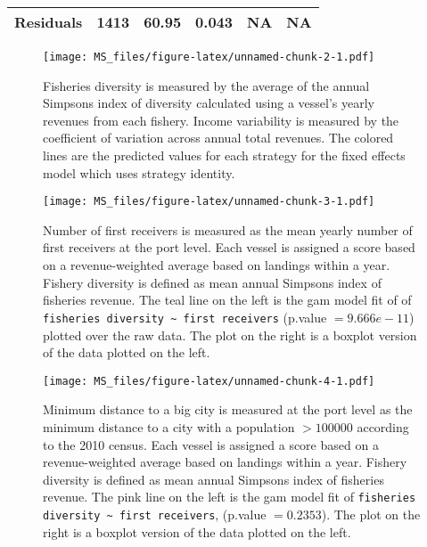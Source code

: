 \documentclass[]{article}
\begin{document}
\begin{longtable}[c]{@{}llllll@{}}
\begin{minipage}[t]{0.36\columnwidth}\raggedright\strut
\textbf{Residuals}
\strut\end{minipage} &
\begin{minipage}[t]{0.05\columnwidth}\raggedright\strut
1413
\strut\end{minipage} &
\begin{minipage}[t]{0.10\columnwidth}\raggedright\strut
60.95
\strut\end{minipage} &
\begin{minipage}[t]{0.11\columnwidth}\raggedright\strut
0.043
\strut\end{minipage} &
\begin{minipage}[t]{0.11\columnwidth}\raggedright\strut
NA
\strut\end{minipage} &
\begin{minipage}[t]{0.11\columnwidth}\raggedright\strut
NA
\strut\end{minipage}\tabularnewline
\bottomrule
\end{longtable}

\begin{figure}[htbp]
\centering
\texttt{[image: MS\_files/figure-latex/unnamed-chunk-2-1.pdf]}
\caption{Fisheries diversity is measured by the average of the annual
Simpsons index of diversity calculated using a vessel's yearly revenues
from each fishery. Income variability is measured by the coefficient of
variation across annual total revenues. The colored lines are the
predicted values for each strategy for the fixed effects model which
uses strategy identity.}
\end{figure}

\begin{figure}[htbp]
\centering
\texttt{[image: MS\_files/figure-latex/unnamed-chunk-3-1.pdf]}
\caption{Number of first receivers is measured as the mean yearly number
of first receivers at the port level. Each vessel is assigned a score
based on a revenue-weighted average based on landings within a year.
Fishery diversity is defined as mean annual Simpsons index of fisheries
revenue. The teal line on the left is the gam model fit of of
\texttt{fisheries diversity \textasciitilde{} first receivers} (p.value
\(= 9.666e-11\)) plotted over the raw data. The plot on the right is a
boxplot version of the data plotted on the left.}
\end{figure}

\begin{figure}[htbp]
\centering
\texttt{[image: MS\_files/figure-latex/unnamed-chunk-4-1.pdf]}
\caption{Minimum distance to a big city is measured at the port level as
the minimum distance to a city with a population \(>100000\) according
to the 2010 census. Each vessel is assigned a score based on a
revenue-weighted average based on landings within a year. Fishery
diversity is defined as mean annual Simpsons index of fisheries revenue.
The pink line on the left is the gam model fit of
\texttt{fisheries diversity \textasciitilde{} first receivers}, (p.value
\(= 0.2353\)). The plot on the right is a boxplot version of the data
plotted on the left.}
\end{figure}
\end{document}
